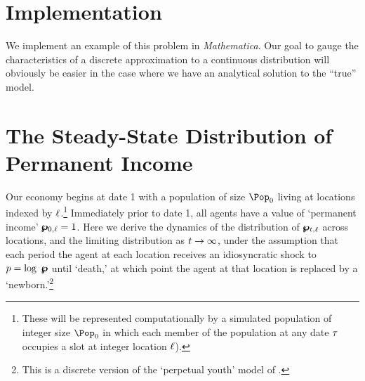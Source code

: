 \documentclass[\econtexRoot/BufferStockTheory.tex]{subfiles}
\begin{document}
\Biggen
\section{Implementation}
We implement an example of this problem in \emph{Mathematica}.
Our goal to gauge the characteristics of a discrete approximation to a continuous distribution will obviously be easier in the case where we have an analytical solution to the ``true'' model.
\section{The Steady-State Distribution of Permanent Income}
Our economy begins at date 1 with a population of size $\Pop_{0}$ living at locations indexed by  $\ell$.\footnote{These will be represented computationally by a simulated population of integer size $\Pop_{0}$ in which each member of the population at any date $\tau$ occupies a slot at integer location $\ell$).}  Immediately prior to date 1, all agents have a value of `permanent income' $\pmb{\wp}_{0,\ell}=1$. 
Here we derive the dynamics of the distribution of $\pmb{\wp}_{t,\ell}$ across locations, and the limiting distribution as $t \rightarrow \infty$, under the assumption that each period the agent at each location receives an idiosyncratic shock to $p = \log ~ \pmb{\wp}$ until `death,' at which point the agent at that location is replaced by a `newborn.'\footnote{This is a discrete version of the `perpetual youth' model of  \cite{blanchardFinite}.} %
\end{document}
